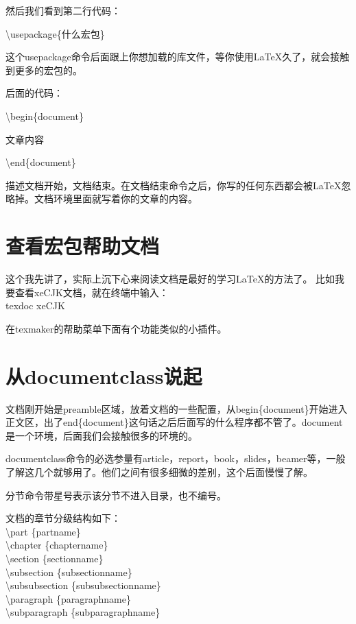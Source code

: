 然后我们看到第二行代码：

\textbackslash usepackage\{什么宏包\}

这个usepackage命令后面跟上你想加载的库文件，等你使用\LaTeX 久了，就会接触到更多的宏包的。

后面的代码：

\textbackslash begin\{document\}

文章内容

\textbackslash end\{document\}

描述文档开始，文档结束。在文档结束命令之后，你写的任何东西都会被\LaTeX 忽略掉。文档环境里面就写着你的文章的内容。

\section{查看宏包帮助文档}
这个我先讲了，实际上沉下心来阅读文档是最好的学习\LaTeX 的方法了。
比如我要查看xeCJK文档，就在终端中输入：\\
texdoc xeCJK

在texmaker的帮助菜单下面有个功能类似的小插件。

\section{从documentclass说起}
\label{sec:documentclass}

文档刚开始是preamble区域，放着文档的一些配置，从begin\{document\}开始进入正文区，出了end\{document\}这句话之后后面写的什么程序都不管了。document是一个环境，后面我们会接触很多的环境的。

documentclass命令的必选参量有article，report，book，slides，beamer等，一般了解这几个就够用了。他们之间有很多细微的差别，这个后面慢慢了解。

分节命令带星号表示该分节不进入目录，也不编号。

文档的章节分级结构如下：\\
\textbackslash part \{partname\}\\
\textbackslash chapter \{chaptername\}\\
\textbackslash section \{sectionname\}\\
\textbackslash subsection \{subsectionname\}\\
\textbackslash subsubsection \{subsubsectionname\}\\
\textbackslash paragraph \{paragraphname\}\\
\textbackslash subparagraph \{subparagraphname\}\\

